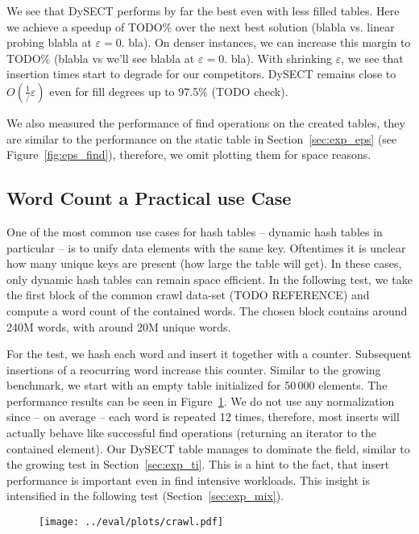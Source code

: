 \documentclass[a4paper,UKenglish]{lipics-v2016}
\begin{document}
We see that DySECT performs by far the best even with less filled
tables.  Here we achieve a speedup of TODO$\%$ over the next best
solution (blabla vs. linear probing blabla at $\varepsilon = 0.$ bla).
On denser instances, we can increase this margin to TODO$\%$ (blabla
vs we'll see blabla at $\varepsilon = 0.$ bla).  With shrinking
$\varepsilon$, we see that insertion times start to degrade for our
competitors.  DySECT remains close to $O(\frac{1}/{\varepsilon})$ even
for fill degrees up to 97.5$\%$ (TODO check).

We also measured the performance of find operations on the created
tables, they are similar to the performance on the static table in
Section~\ref{sec:exp_eps} (see Figure~\ref{fig:eps_find}), therefore,
we omit plotting them for space reasons.

\subsection{Word Count a Practical use Case}
One of the most common use cases for hash tables -- dynamic hash
tables in particular -- is to unify data elements with the same key.
Oftentimes it is unclear how many unique keys are present (how large
the table will get).  In these cases, only dynamic hash tables can
remain space efficient.  In the following test, we take the first
block of the common crawl data-set (TODO REFERENCE) and compute a word
count of the contained words.  The chosen block contains around 240M
words, with around 20M unique words.

For the test, we hash each word and insert it together with a counter.
Subsequent insertions of a reocurring word increase this counter.
Similar to the growing benchmark, we start with an empty table
initialized for 50\,000 elements.  The performance results can be seen
in Figure~\ref{fig:crawl}.  We do not use any normalization since --
on average -- each word is repeated 12 times, therefore, most inserts
will actually behave like successful find operations (returning an
iterator to the contained element).  Our DySECT table manages to
dominate the field, similar to the growing test in
Section~\ref{sec:exp_ti}.  This is a hint to the fact, that insert
performance is important even in find intensive workloads.  This
insight is intensified in the following test
(Section~\ref{sec:exp_mix}).

\begin{figure}[ht]
  \centering
  \texttt{[image: ../eval/plots/crawl.pdf]}
  \caption{\label{fig:crawl} }
\end{figure}
\end{document}
